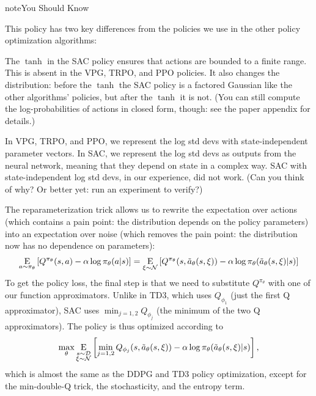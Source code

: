 \documentclass[letterpaper,10pt,english]{sphinxmanual}
\newcommand{\E}{{\mathrm E}}
\newcommand{\underE}[2]{\underset{\begin{subarray}{c}#1 \end{subarray}}{\E}\left[ #2 \right]}
\begin{document}
\begin{sphinxadmonition}{note}{You Should Know}

This policy has two key differences from the policies we use in the other policy optimization algorithms:

 The \(\tanh\) in the SAC policy ensures that actions are bounded to a finite range. This is absent in the VPG, TRPO, and PPO policies. It also changes the distribution: before the \(\tanh\) the SAC policy is a factored Gaussian like the other algorithms’ policies, but after the \(\tanh\) it is not. (You can still compute the log-probabilities of actions in closed form, though: see the paper appendix for details.)

 In VPG, TRPO, and PPO, we represent the log std devs with state-independent parameter vectors. In SAC, we represent the log std devs as outputs from the neural network, meaning that they depend on state in a complex way. SAC with state-independent log std devs, in our experience, did not work. (Can you think of why? Or better yet: run an experiment to verify?)
\end{sphinxadmonition}

The reparameterization trick allows us to rewrite the expectation over actions (which contains a pain point: the distribution depends on the policy parameters) into an expectation over noise (which removes the pain point: the distribution now has no dependence on parameters):
\begin{equation*}
\begin{split}\underE{a \sim \pi_{\theta}}{Q^{\pi_{\theta}}(s,a) - \alpha \log \pi_{\theta}(a|s)} = \underE{\xi \sim \mathcal{N}}{Q^{\pi_{\theta}}(s,\tilde{a}_{\theta}(s,\xi)) - \alpha \log \pi_{\theta}(\tilde{a}_{\theta}(s,\xi)|s)}\end{split}
\end{equation*}
To get the policy loss, the final step is that we need to substitute \(Q^{\pi_{\theta}}\) with one of our function approximators. Unlike in TD3, which uses \(Q_{\phi_1}\) (just the first Q approximator), SAC uses \(\min_{j=1,2} Q_{\phi_j}\) (the minimum of the two Q approximators). The policy is thus optimized according to
\begin{equation*}
\begin{split}\max_{\theta} \underE{s \sim \mathcal{D} \\ \xi \sim \mathcal{N}}{\min_{j=1,2} Q_{\phi_j}(s,\tilde{a}_{\theta}(s,\xi)) - \alpha \log \pi_{\theta}(\tilde{a}_{\theta}(s,\xi)|s)},\end{split}
\end{equation*}
which is almost the same as the DDPG and TD3 policy optimization, except for the min-double-Q trick, the stochasticity, and the entropy term.
\end{document}
